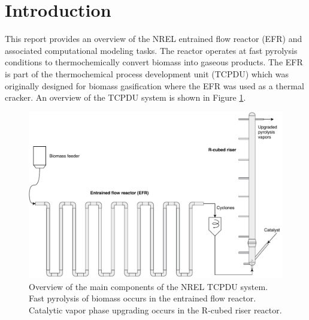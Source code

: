 
\section{Introduction}

This report provides an overview of the NREL entrained flow reactor (EFR) and associated computational modeling tasks. The reactor operates at fast pyrolysis conditions to thermochemically convert biomass into gaseous products. The EFR is part of the thermochemical process development unit (TCPDU) which was originally designed for biomass gasification where the EFR was used as a thermal cracker. An overview of the TCPDU system is shown in Figure \ref{fig:tcpdu-system}.

\begin{figure}[H]
    \centering
    \includegraphics[width=\textwidth]{figures/tcpdu-system.pdf}
    \caption{Overview of the main components of the NREL TCPDU system. Fast pyrolysis of biomass occurs in the entrained flow reactor. Catalytic vapor phase upgrading occurs in the R-cubed riser reactor.}
    \label{fig:tcpdu-system}
\end{figure}
